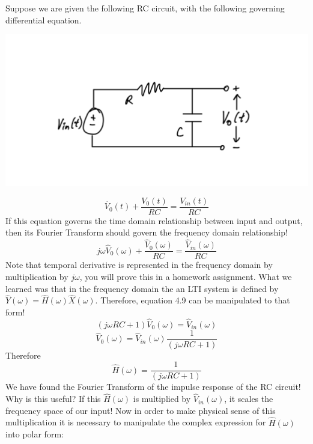 \documentclass[a4paper]{article}
\numberwithin{equation}{section}
\begin{document}
Suppose we are given the following RC circuit, with the following governing differential equation.
\begin{center}
\includegraphics[scale=0.5]{RC.png}
\end{center}
\begin{equation}
\dot{V_0}(t)+\frac{V_0(t)}{RC}=\frac{V_{in}(t)}{RC}
\end{equation}
If this equation governs the time domain relationship between input and output, then its Fourier Transform should govern the frequency domain relationship! 
\begin{equation}
j\omega \hat{V}_0(\omega)+\frac{\hat{V}_0(\omega)}{RC}=\frac{\hat{V}_{in}(\omega)}{RC}
\end{equation}
Note that temporal derivative is represented in the frequency domain by multiplication by $j\omega$, you will prove this in a homework assignment. What we learned was that in the frequency domain the an LTI system is defined by $\hat{Y}(\omega)=\hat{H}(\omega)\hat{X}(\omega)$. Therefore, equation 4.9 can be manipulated to that form!
\begin{equation}
(j\omega RC +1)\hat{V}_0(\omega)=\hat{V}_{in}(\omega)
\end{equation}
\begin{equation}
\hat{V}_0(\omega)=\hat{V}_{in}(\omega)\frac{1}{(j\omega RC +1)}
\end{equation}
Therefore
\begin{equation}
\hat{H}(\omega)=\frac{1}{(j\omega RC +1)}
\end{equation}
We have found the Fourier Transform of the impulse response of the RC circuit! Why is this useful? If this $\hat{H}(\omega)$ is multiplied by $\hat{V}_{in}(\omega)$, it scales the frequency space of our input! Now in order to make physical sense of this multiplication it is necessary to manipulate the  complex expression for $\hat{H}(\omega)$ into polar form:
\end{document}
